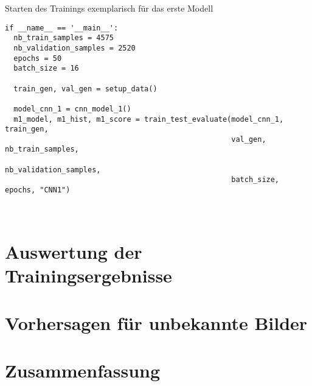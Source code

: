 \begin{listing} [ht]
	\caption{Starten des Trainings exemplarisch für das erste Modell}
	\label{lst:start-training}
	\begin{verbatim}
if __name__ == '__main__':
  nb_train_samples = 4575
  nb_validation_samples = 2520
  epochs = 50
  batch_size = 16

  train_gen, val_gen = setup_data()

  model_cnn_1 = cnn_model_1()
  m1_model, m1_hist, m1_score = train_test_evaluate(model_cnn_1, train_gen,
                                                    val_gen, nb_train_samples,
                                                    nb_validation_samples,
                                                    batch_size, epochs, "CNN1")
	\end{verbatim}
\end{listing} \ \\
 
\section{Auswertung der Trainingsergebnisse}

\section{Vorhersagen für unbekannte Bilder}

\section{Zusammenfassung}

